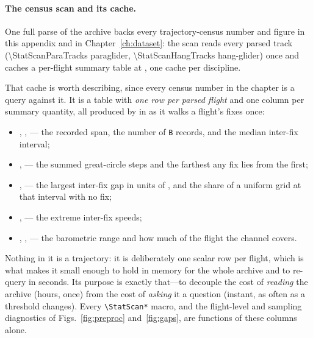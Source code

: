 \paragraph{The census scan and its cache.}
One full parse of the archive backs every trajectory-census number and figure in this
appendix and in Chapter~\ref{ch:dataset}: the  scan reads
every parsed track (\num{\StatScanParaTracks} paraglider, \num{\StatScanHangTracks}
hang-glider) once and caches a per-flight summary table at
, one cache per discipline.

\begin{revblock}
That cache is worth describing, since every census number in the chapter is a query
against it. It is a table with \emph{one row per parsed flight} and one column per summary
quantity, all produced by  in
 as it walks a flight's fixes once:
\begin{itemize}[nosep]
  \item {}, ,  --- the recorded span, the number of
        \texttt{B} records, and the median inter-fix interval;
  \item {},  --- the summed great-circle steps and the
        farthest any fix lies from the first;
  \item {},  --- the largest inter-fix gap in
        units of , and the share of a uniform grid at that interval with no fix;
  \item {},  --- the extreme inter-fix speeds;
  \item {}, ,  --- the
        barometric range and how much of the flight the channel covers.
\end{itemize}
Nothing in it is a trajectory: it is deliberately one scalar row per flight, which is what
makes it small enough to hold in memory for the whole archive and to re-query in seconds.
Its purpose is exactly that---to decouple the cost of \emph{reading} the archive (hours,
once) from the cost of \emph{asking} it a question (instant, as often as a threshold
changes). Every \texttt{\textbackslash StatScan*} macro, and the flight-level and
sampling diagnostics of Figs.~\ref{fig:preproc} and~\ref{fig:gaps}, are functions of these
columns alone.


\end{revblock}

